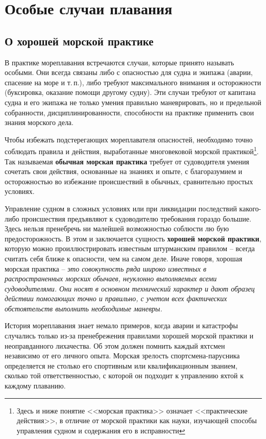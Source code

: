 \documentclass[a4paper, 12pt, twoside, final]{scrbook}
\begin{document}
\chapter{Особые случаи плавания}

\section{О хорошей морской практике}

В практике мореплавания встречаются случаи, которые принято называть особыми. Они всегда связаны либо с опасностью для судна и экипажа (аварии, спасение на море и т.\,п.), либо требуют максимального внимания и осторожности (буксировка, оказание помощи другому судну). Эти случаи требуют от капитана судна и его экипажа не только умения правильно маневрировать, но и предельной собранности, дисциплинированности, способности на практике применить свои знания морского дела.

Чтобы избежать подстерегающих мореплавателя опасностей, необходимо точно соблюдать правила и действия, выработанные многовековой морской практикой\footnote{Здесь и ниже понятие <<морская практика>> означает <<практические действия>>, в отличие от морской практики как науки, изучающей способы управления судном и содержания его в исправности}. Так называемая \textbf{обычная морская практика} требует от судоводителя умения сочетать свои действия, основанные на знаниях и опыте, с благоразумием и осторожностью во избежание происшествий в обычных, сравнительно простых условиях.

Управление судном в сложных условиях или при ликвидации последствий какого-либо происшествия предъявляют к судоводителю требования гораздо большие. Здесь нельзя пренебречь ни малейшей возможностью соблюсти лю бую предосторожность. В этом и заключается сущность \textbf{хорошей морской практики}, которую можно проиллюстрировать известным штурманским правилом \--- всегда считать себя ближе к опасности, чем на самом деле. Иначе говоря, хорошая морская практика \--- \textit{это совокупность ряда широко известных в распространенных морских обычаев, неуклонно выполняемых всеми судоводителями. Они носят в основном технический характер и дают образец действии помогающих точно и правильно, с учетом всех фактических обстоятельств выполнить необходимые маневры.}

История мореплавания знает немало примеров, когда аварии и катастрофы случались только из-за пренебрежения правилами хорошей морской практики и неоправданного лихачества. Об этом должен помнить каждый яхтсмен независимо от его личного опыта. Морская зрелость спортсмена-парусника определяется не столько его спортивным или квалификационным званием, сколько той ответственностью, с которой он подходит к управлению яхтой к каждому плаванию.
\end{document}
